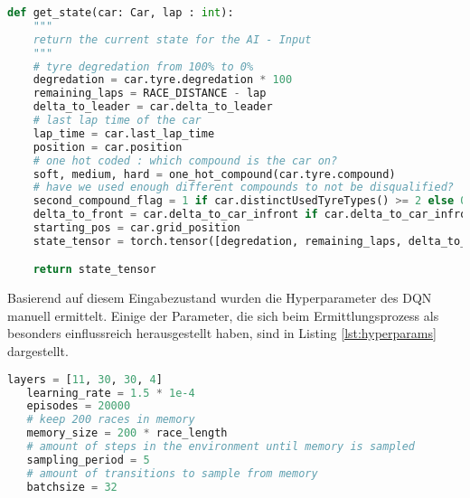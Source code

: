 \begin{lstlisting}[label={lst:race_state}, caption={Ermittlung des Eingabezustands des neuronalen Netzes}, language={Python}]
def get_state(car: Car, lap : int):
    """
    return the current state for the AI - Input
    """
    # tyre degredation from 100% to 0%
    degredation = car.tyre.degredation * 100
    remaining_laps = RACE_DISTANCE - lap
    delta_to_leader = car.delta_to_leader
    # last lap time of the car
    lap_time = car.last_lap_time
    position = car.position
    # one hot coded : which compound is the car on?
    soft, medium, hard = one_hot_compound(car.tyre.compound)
    # have we used enough different compounds to not be disqualified?
    second_compound_flag = 1 if car.distinctUsedTyreTypes() >= 2 else 0
    delta_to_front = car.delta_to_car_infront if car.delta_to_car_infront != "-" else 0
    starting_pos = car.grid_position
    state_tensor = torch.tensor([degredation, remaining_laps, delta_to_leader, lap_time, position, soft, medium, hard, second_compound_flag, delta_to_front, starting_pos], dtype=torch.float32)

    return state_tensor
\end{lstlisting}
Basierend auf diesem Eingabezustand wurden die Hyperparameter des DQN manuell ermittelt. Einige der Parameter, die sich beim Ermittlungsprozess als besonders einflussreich herausgestellt haben, sind in Listing \ref{lst:hyperparams} dargestellt.
\begin{lstlisting}[label={lst:hyperparams}, caption={Ausgewählte, wichtige Hyperparameter des DQN}, language={Python}]
   layers = [11, 30, 30, 4]
   learning_rate = 1.5 * 1e-4
   episodes = 20000
   # keep 200 races in memory
   memory_size = 200 * race_length
   # amount of steps in the environment until memory is sampled
   sampling_period = 5
   # amount of transitions to sample from memory
   batchsize = 32
\end{lstlisting}

